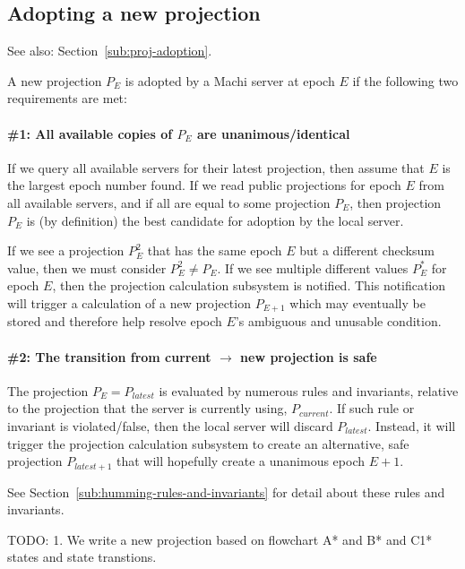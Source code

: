 \documentclass[preprint,10pt]{sigplanconf}
\begin{document}
\subsection{Adopting a new projection}
\label{sub:humming-proj-adoption}

See also: Section~\ref{sub:proj-adoption}.

A new projection $P_E$ is adopted by a Machi server at epoch $E$ if
the following two requirements are met:

\paragraph{\#1: All available copies of $P_E$ are unanimous/identical}

If we query all available servers for their latest projection, then assume
that $E$ is the largest epoch number found.  If we read public
projections for epoch $E$ from all available servers, and if all are
equal to some projection $P_E$, then projection $P_E$ is
(by definition) the best candidate for adoption by the local server.

If we see a projection $P^2_E$ that has the same epoch $E$ but a
different checksum value, then we must consider $P^2_E \ne P_E$.
If we see multiple different values $P^*_E$ for epoch $E$, then the
projection calculation subsystem is notified.  This notification
will trigger a calculation of a new projection $P_{E+1}$ which
may eventually be stored and therefore help
resolve epoch $E$'s ambiguous and unusable condition.

\paragraph{\#2: The transition from current $\rightarrow$ new projection is
safe}

The projection $P_E = P_{latest}$ is evaluated by numerous rules and
invariants, relative to the projection that the server is currently
using, $P_{current}$.  If such rule or invariant is violated/false,
then the local server will discard $P_{latest}$.  Instead, it will
trigger the projection calculation subsystem to create an alternative,
safe projection $P_{latest+1}$ that will hopefully create a unanimous
epoch $E+1$.

See Section~\ref{sub:humming-rules-and-invariants} for detail about
these rules and invariants.

TODO:
1. We write a new projection based on flowchart A* and B* and C1* states and
state transtions.
\end{document}
